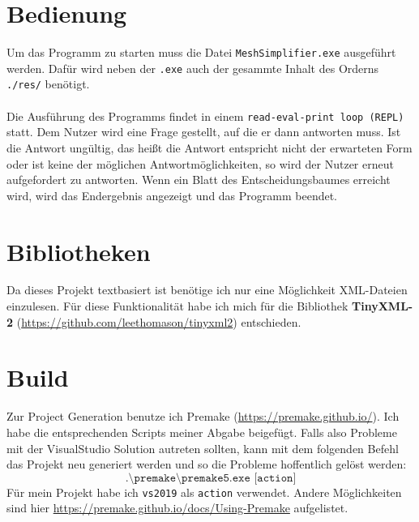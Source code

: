 \documentclass[a4paper,12pt]{article}
\begin{document}
\newpage
\section*{Bedienung}

Um das Programm zu starten muss die Datei \texttt{MeshSimplifier.exe} ausgeführt werden. Dafür wird neben der \texttt{.exe} auch der gesammte Inhalt des Orderns \texttt{./res/} benötigt.
\\
\\
Die Ausführung des Programms findet in einem \texttt{read-eval-print loop (REPL)} statt. Dem Nutzer wird eine Frage gestellt, auf die er dann antworten muss. Ist die Antwort ungültig, das heißt die Antwort entspricht nicht der erwarteten Form oder ist keine der möglichen Antwortmöglichkeiten, so wird der Nutzer erneut aufgefordert zu antworten. 
Wenn ein Blatt des Entscheidungsbaumes erreicht wird, wird das Endergebnis angezeigt und das Programm beendet.

\section*{Bibliotheken}

Da dieses Projekt textbasiert ist benötige ich nur eine Möglichkeit XML-Dateien einzulesen. Für diese Funktionalität habe ich mich für die Bibliothek \textbf{TinyXML-2} (\url{https://github.com/leethomason/tinyxml2}) entschieden.
 

\section*{Build}

Zur Project Generation benutze ich Premake (\url{https://premake.github.io/}). Ich habe die entsprechenden Scripts meiner Abgabe beigefügt.
Falls also Probleme mit der VisualStudio Solution autreten sollten,
kann mit dem folgenden Befehl das Projekt neu generiert werden und so die Probleme hoffentlich gelöst werden:
\[\texttt{.\textbackslash premake\textbackslash premake5.exe [action]}\]
Für mein Projekt habe ich \texttt{vs2019} als \texttt{action} verwendet. Andere Möglichkeiten sind hier \url{https://premake.github.io/docs/Using-Premake} aufgelistet.
\end{document}
